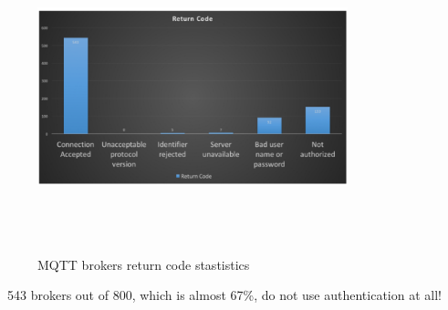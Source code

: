 \documentclass[12pt]{report}
\begin{document}
{\begin{figure}[H]
\includegraphics[width=9cm,height=9cm,keepaspectratio]{shodan_results}
\centering
\caption{MQTT brokers return code stastistics}
\end{figure}\
543 brokers out of 800, which is almost 67\%, do not use authentication at all!
\\\\\\\\

\clearpage

}
\end{document}
